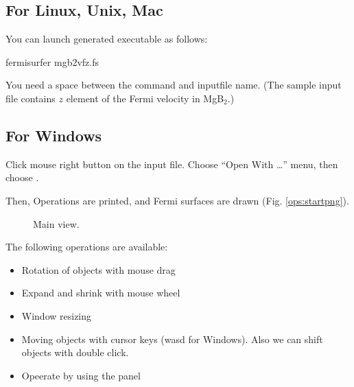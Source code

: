 \documentclass[letterpaper,10pt,pdftex,openany,english]{sphinxmanual}
\let\sphinxpxdimen\pdfpxdimen\else\newdimen\sphinxpxdimen
\begin{document}
\subsection{For Linux, Unix, Mac}
\label{\detokenize{ops:for-linux-unix-mac}}
\sphinxAtStartPar
You can launch generated executable as follows:

\begin{sphinxVerbatim}[commandchars=\\\{\}]
\PYGZdl{} fermisurfer mgb2\PYGZus{}vfz.fs
\end{sphinxVerbatim}

\sphinxAtStartPar
You need a space between the command and input\sphinxhyphen{}file name.
(The sample input file  contains \(z\) element of
the Fermi velocity in MgB$_{\text{2}}$.)


\subsection{For Windows}
\label{\detokenize{ops:for-windows}}
\sphinxAtStartPar
Click mouse right button on the input file. Choose “Open With …” menu,
then choose .

\sphinxAtStartPar
Then, Operations are printed, and Fermi surfaces are drawn (Fig. \ref{ops:startpng}).

\begin{figure}[htbp]
\centering
\capstart

\noindent\sphinxincludegraphics[width=500\sphinxpxdimen]{{start}.png}
\caption{Main view.}\label{\detokenize{ops:id1}}\label{\detokenize{ops:startpng}}\end{figure}

\sphinxAtStartPar
The following operations are available:
\begin{itemize}
\item {} 
\sphinxAtStartPar
Rotation of objects with mouse drag

\item {} 
\sphinxAtStartPar
Expand and shrink with mouse wheel

\item {} 
\sphinxAtStartPar
Window re\sphinxhyphen{}sizing

\item {} 
\sphinxAtStartPar
Moving objects with cursor keys (wasd for Windows).
Also we can shift objects with double click.

\item {} 
\sphinxAtStartPar
Opeerate by using the panel

\end{itemize}
\end{document}
